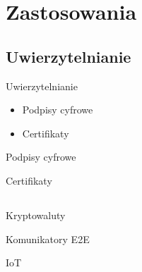 \section{Zastosowania}

\subsection{Uwierzytelnianie}
\begin{frame}{Uwierzytelnianie}
    \begin{itemize}
        \pause
        \item Podpisy cyfrowe
        \pause
        \item Certifikaty
    \end{itemize}
\end{frame}

\begin{frame}{Podpisy cyfrowe}
    
\end{frame}

\begin{frame}{Certifikaty}

\end{frame}
\subsection{}
\begin{frame}{Kryptowaluty}
    
\end{frame}

\begin{frame}{Komunikatory E2E}
    
\end{frame}

\begin{frame}{IoT}
\end{frame}

